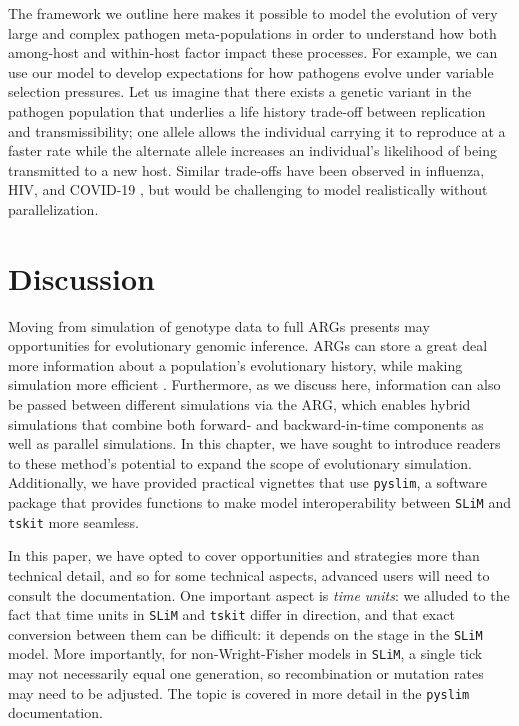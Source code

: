 \documentclass[12pt]{article}
\newcommand{\tskit}[0]{\texttt{tskit}\xspace}
\newcommand{\slim}[0]{\texttt{SLiM}\xspace}
\newcommand{\pyslim}[0]{\texttt{pyslim}\xspace}
\begin{document}
The framework we outline here makes it possible to model the evolution of very large and complex pathogen meta-populations in order to understand how both among-host
and within-host factor impact these processes. For example, we can use our model to develop expectations for how pathogens evolve under variable selection pressures. Let
us imagine that there exists a genetic variant in the pathogen population that underlies a life history trade-off between replication and transmissibility; one allele allows the
individual carrying it to reproduce at a faster rate while the alternate allele increases an individual's likelihood of being transmitted to a new host. Similar trade-offs have been observed in influenza, HIV, and COVID-19 \citep{liang2023pathogenicity, arien2005replicative, zhu2022ancestral}, but would be challenging to model realistically without parallelization. 

\section*{Discussion}

Moving from simulation of genotype data to full ARGs presents may opportunities for evolutionary genomic inference.
ARGs can store a great deal more information about a population's evolutionary history,
while making simulation more efficient \citep{kelleher_efficient_2018}.
Furthermore, as we discuss here, information can also be passed between different simulations via the ARG,
which enables hybrid simulations that combine both forward- and backward-in-time components as well as parallel simulations.
In this chapter, we have sought to introduce readers to these method's potential to expand the scope of evolutionary simulation.
Additionally, we have provided practical vignettes that use \pyslim,
a software package that provides functions to make model interoperability between \slim and \tskit more seamless.

In this paper, we have opted to cover opportunities and strategies more than technical detail,
and so for some technical aspects, advanced users will need to consult the documentation.
One important aspect is \emph{time units}:
we alluded to the fact that time units in \slim and \tskit differ in direction,
and that exact conversion between them can be difficult:
it depends on the stage in the \slim model.
More importantly, for non-Wright-Fisher models in \slim, a single tick may not necessarily equal one generation,
so recombination or mutation rates may need to be adjusted.
The topic is covered in more detail in the \pyslim documentation.
\end{document}
